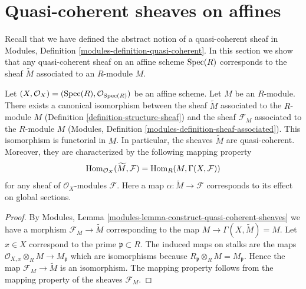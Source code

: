 \section{Quasi-coherent sheaves on affines}
\label{section-quasi-coherent-affine}

\noindent
Recall that we have defined the abstract notion of a quasi-coherent
sheaf in Modules, Definition \ref{modules-definition-quasi-coherent}.
In this section we show that any quasi-coherent sheaf on an affine
scheme $\mathop{\mathrm{Spec}}(R)$ corresponds to the sheaf $\widetilde M$ associated to
an $R$-module $M$.

\begin{lemma}
\label{lemma-compare-constructions}
Let $(X, \mathcal{O}_X) = (\mathop{\mathrm{Spec}}(R), \mathcal{O}_{\mathop{\mathrm{Spec}}(R)})$
be an affine scheme. Let $M$ be an $R$-module. There exists a canonical
isomorphism between the sheaf $\widetilde M$ associated to the $R$-module
$M$ (Definition \ref{definition-structure-sheaf}) and the sheaf
$\mathcal{F}_M$ associated to the $R$-module $M$
(Modules, Definition \ref{modules-definition-sheaf-associated}).
This isomorphism is functorial in $M$. In particular,
the sheaves $\widetilde M$ are quasi-coherent. Moreover, they
are characterized by the following mapping property
$$
\mathop{\mathrm{Hom}}\nolimits_{\mathcal{O}_X}(\widetilde M, \mathcal{F})
=
\mathop{\mathrm{Hom}}\nolimits_R(M, \Gamma(X, \mathcal{F}))
$$
for any sheaf of $\mathcal{O}_X$-modules $\mathcal{F}$.
Here a map $\alpha : \widetilde M \to \mathcal{F}$ corresponds
to its effect on global sections.
\end{lemma}

\begin{proof}
By Modules, Lemma \ref{modules-lemma-construct-quasi-coherent-sheaves}
we have a morphism $\mathcal{F}_M \to \widetilde M$ corresponding
to the map $M \to \Gamma(X, \widetilde M) = M$. Let $x \in X$
correspond to the prime $\mathfrak p \subset R$.
The induced maps on stalks are the maps
$\mathcal{O}_{X, x} \otimes_R M \to M_{\mathfrak p}$
which are isomorphisms because
$R_{\mathfrak p} \otimes_R M = M_{\mathfrak p}$.
Hence the map $\mathcal{F}_M \to \widetilde M$ is an isomorphism.
The mapping property follows from the mapping property of
the sheaves $\mathcal{F}_M$.
\end{proof}


